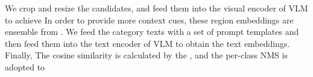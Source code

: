 \documentclass[sigconf]{acmart}
\begin{document}
 We crop and resize the  candidates, and feed them into the visual encoder of VLM to achieve  In order to provide more context cues, these region embeddings are ensemble from . We feed the category texts with a set of prompt templates and then feed them into the text encoder of VLM to obtain the text embeddings. 
Finally, The cosine similarity is calculated by the , and the per-class NMS is adopted to 


\end{document}
